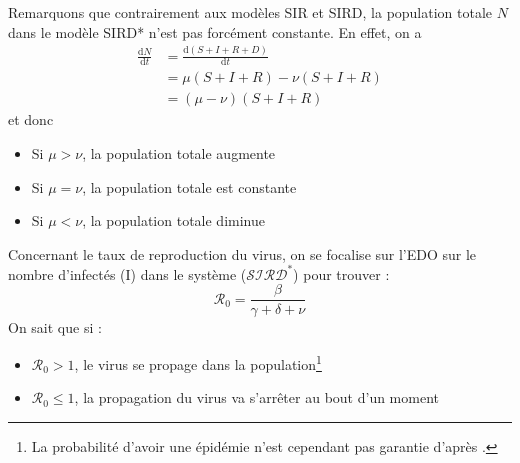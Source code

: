 \documentclass[
  french,
	10pt, %
]{fphw}
\begin{document}
Remarquons que contrairement aux modèles SIR et SIRD, la population totale $N$ dans le modèle SIRD* n'est pas forcément constante. En effet, on a 
\begin{align*}
  \frac{\mathrm{d}N}{\mathrm{d}t} &= \frac{\mathrm{d}(S+I+R+D)}{\mathrm{d}t} \\
  &= \mu (S+I+R) -\nu (S+I+R) \\
  &=  (\mu -\nu) (S+I+R)
\end{align*}
et donc
\begin{itemize}
  \item Si $\mu > \nu$, la population totale augmente
  \item Si $\mu = \nu$, la population totale est constante
  \item Si $\mu < \nu$, la population totale diminue
\end{itemize}

Concernant le taux de reproduction du virus, on se focalise sur l'EDO sur le nombre d'infectés (I) dans le système ($\mathcal{SIRD^*}$) pour trouver :
$$\mathcal{R}_0 = \frac{\beta}{\gamma + \delta + \nu}$$
On sait que si :
\begin{itemize}
  \item $\mathcal{R}_0 > 1$, le virus se propage dans la population\footnote{La probabilité d'avoir une épidémie n'est cependant pas garantie d'après \cite[p.4]{Nguemdjo}.}
  \item $\mathcal{R}_0 \leq 1$, la propagation du virus va s'arrêter au bout d'un moment
\end{itemize}
\end{document}
